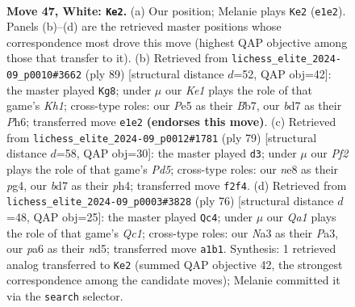 \documentclass[11pt]{article}
\begin{document}
\clearpage

\begin{figure}[p]\centering
\begin{subfigure}{0.46\textwidth}\centering
\resizebox{\linewidth}{!}{%
\newchessgame
\chessboard[
  setfen={4n3/3b2k1/p7/4Pp1p/3P2p1/N7/5PqP/Q3K1N1 w - - 0 47},
  showmover=false,
  pgfstyle=straightmove, color=movearrow, markmove={e1-e2}
]}
\caption{}
\end{subfigure}\hfill
\begin{subfigure}{0.46\textwidth}\centering
\resizebox{\linewidth}{!}{%
\newchessgame
\chessboard[
  setfen={4q2k/1b4p1/2p4p/1nQ1p3/4P3/5PP1/1P4P1/R5K1 b - - 15 45},
  showmover=false,
  pgfstyle=straightmove, color=movearrow, markmove={h8-g8}
]}
\caption{}
\end{subfigure}
\\[4pt]
\begin{subfigure}{0.46\textwidth}\centering
\resizebox{\linewidth}{!}{%
\newchessgame
\chessboard[
  setfen={8/2nq1k1p/6p1/4Q3/p2p1pPP/5P2/5PK1/1R6 b - - 1 40},
  showmover=false,
  pgfstyle=straightmove, color=movearrow, markmove={d4-d3}
]}
\caption{}
\end{subfigure}\hfill
\begin{subfigure}{0.46\textwidth}\centering
\resizebox{\linewidth}{!}{%
\newchessgame
\chessboard[
  setfen={3k4/p1p3p1/1p6/3nNq2/3P4/P4P2/6P1/2Q3K1 w - - 3 39},
  showmover=false,
  pgfstyle=straightmove, color=movearrow, markmove={c1-c4}
]}
\caption{}
\end{subfigure}
\caption{\textbf{Move 47, White: \texttt{Ke2}.} (a) Our position; Melanie plays \texttt{Ke2} (\texttt{e1e2}). Panels (b)--(d) are the retrieved master positions whose correspondence most drove this move (highest QAP objective among those that transfer to it). (b) Retrieved from \texttt{lichess\_elite\_2024-09\_p0010\#3662} (ply 89) [structural distance $d$=52, QAP obj=42]: the master played \texttt{Kg8}; under $\mu$ our \emph{Ke1} plays the role of that game's \emph{Kh1}; cross-type roles: our \emph{P}e5 as their \emph{B}b7, our \emph{b}d7 as their \emph{P}h6; transferred move \texttt{e1e2} \textbf{(endorses this move)}. (c) Retrieved from \texttt{lichess\_elite\_2024-09\_p0012\#1781} (ply 79) [structural distance $d$=58, QAP obj=30]: the master played \texttt{d3}; under $\mu$ our \emph{Pf2} plays the role of that game's \emph{Pd5}; cross-type roles: our \emph{n}e8 as their \emph{p}g4, our \emph{b}d7 as their \emph{p}h4; transferred move \texttt{f2f4}. (d) Retrieved from \texttt{lichess\_elite\_2024-09\_p0003\#3828} (ply 76) [structural distance $d$=48, QAP obj=25]: the master played \texttt{Qc4}; under $\mu$ our \emph{Qa1} plays the role of that game's \emph{Qc1}; cross-type roles: our \emph{N}a3 as their \emph{P}a3, our \emph{p}a6 as their \emph{n}d5; transferred move \texttt{a1b1}. Synthesis: 1 retrieved analog transferred to \texttt{Ke2} (summed QAP objective 42, the strongest correspondence among the candidate moves); Melanie committed it via the \texttt{search} selector.}
\label{fig:thought-m92}
\end{figure}
\end{document}
